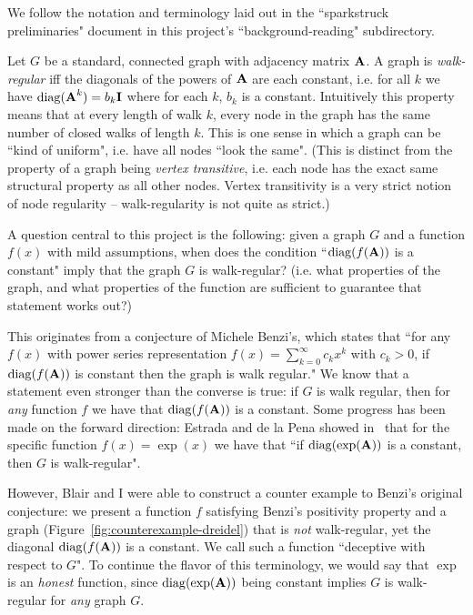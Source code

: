 
We follow the notation and terminology laid out in the ``sparkstruck preliminaries" document in this project's ``background-reading" subdirectory.

Let $G$ be a standard, connected graph with adjacency matrix $\textbf{A}$. A graph is \emph{walk-regular} iff the diagonals of the powers of $\textbf{A}$ are each constant, i.e. for all $k$ we have $\operatorname{diag}( \textbf{A}^k ) = b_k \textbf{I}$ where for each $k$, $b_k$ is a constant. Intuitively this property means that at every length of walk $k$, every node in the graph has the same number of closed walks of length $k$. This is one sense in which a graph can be ``kind of uniform", i.e. have all nodes ``look the same". (This is distinct from the property of a graph being \emph{vertex transitive}, i.e. each node has the exact same structural property as all other nodes. Vertex transitivity is a very strict notion of node regularity -- walk-regularity is not quite as strict.)


A question central to this project is the following: given a graph $G$ and a function $f(x)$ with mild assumptions, when does the condition ``$\operatorname{diag}( f(\textbf{A}) )$ is a constant" imply that the graph $G$ is walk-regular? (i.e. what properties of the graph, and what properties of the function are sufficient to guarantee that statement works out?)

This originates from a conjecture of Michele Benzi's, which states that ``for any $f(x)$ with power series representation $f(x) = \sum_{k=0}^{\infty} c_k x^k$ with $c_k > 0$, if $\operatorname{diag}( f(\textbf{A}) )$ is constant then the graph is walk regular."
We know that a statement even stronger than the converse is true: if $G$ is walk regular, then for \emph{any} function $f$ we have that $\operatorname{diag}(f(\textbf{A}))$ is a constant.
Some progress has been made on the forward direction: Estrada and de la Pena showed in~\cite{estrada2014maximum} that for the specific function $f(x) = \exp(x)$ we have that ``if $\operatorname{diag}(\exp(\textbf{A}))$ is a constant, then $G$ is walk-regular".

However, Blair and I were able to construct a counter example to Benzi's original conjecture: we present a function $f$ satisfying Benzi's positivity property and a graph (Figure~\ref{fig:counterexample-dreidel}) that is \emph{not} walk-regular, yet the diagonal $\operatorname{diag}(f(\textbf{A}))$ is a constant. We call such a function ``deceptive with respect to $G$". To continue the flavor of this terminology, we would say that $\exp$ is an \emph{honest} function, since $\operatorname{diag}(\exp(\textbf{A}))$ being constant implies $G$ is walk-regular for \emph{any} graph $G$.

